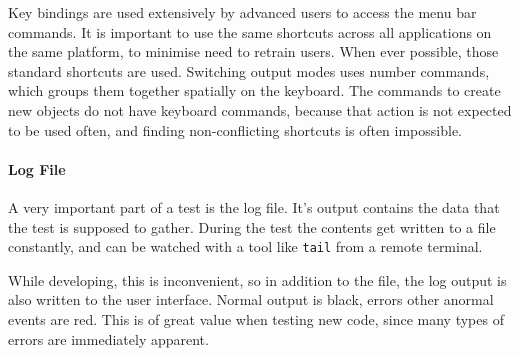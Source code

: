 Key bindings are used extensively by advanced users to access the menu bar commands.
It is important to use the same shortcuts across all applications on the same platform, to minimise need to retrain users.
When ever possible, those standard shortcuts are used.
Switching output modes uses number commands, which groups them together spatially on the keyboard.
The commands to create new objects do not have keyboard commands, because that action is not expected to be used often, and finding non-conflicting shortcuts is often impossible.

\paragraph{Log File}
A very important part of a test is the log file.
It's output contains the data that the test is supposed to gather.
During the test the contents get written to a file constantly, and can be watched with a tool like \texttt{tail} from a remote terminal.

While developing, this is inconvenient, so in addition to the file, the log output is also written to the user interface.
Normal output is black, errors other anormal events are red.
This is of great value when testing new code, since many types of errors are immediately apparent.

